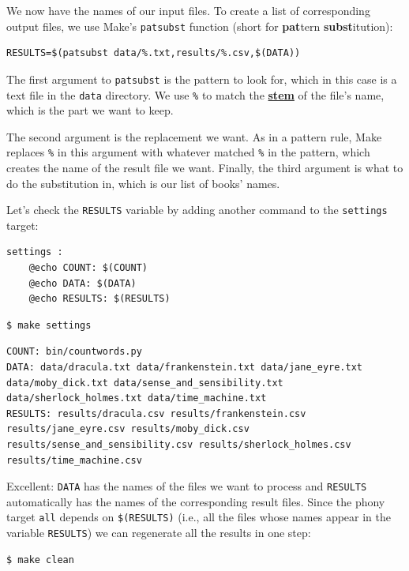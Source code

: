 \documentclass[
]{krantz}
\newcommand{\gref}[2]{\hyperlink{#2}{\textbf{#1}}}
\begin{document}
We now have the names of our input files.
To create a list of corresponding output files,
we use Make's \texttt{patsubst} function
(short for \textbf{pat}tern \textbf{subst}itution):

\begin{verbatim}
RESULTS=$(patsubst data/%.txt,results/%.csv,$(DATA))
\end{verbatim}

The first argument to \texttt{patsubst} is the pattern to look for,
which in this case is a text file in the \texttt{data} directory.
We use \texttt{\%} to match the \gref{stem}{filename\_stem} of the file's name,
which is the part we want to keep.

The second argument is the replacement we want.
As in a pattern rule,
Make replaces \texttt{\%} in this argument with whatever matched \texttt{\%} in the pattern,
which creates the name of the result file we want.
Finally,
the third argument is what to do the substitution in,
which is our list of books' names.

Let's check the \texttt{RESULTS} variable by adding another command to the \texttt{settings} target:

\begin{verbatim}
settings :
    @echo COUNT: $(COUNT)
    @echo DATA: $(DATA)
    @echo RESULTS: $(RESULTS)
\end{verbatim}

\begin{verbatim}
$ make settings
\end{verbatim}

\begin{verbatim}
COUNT: bin/countwords.py
DATA: data/dracula.txt data/frankenstein.txt data/jane_eyre.txt data/moby_dick.txt data/sense_and_sensibility.txt data/sherlock_holmes.txt data/time_machine.txt
RESULTS: results/dracula.csv results/frankenstein.csv results/jane_eyre.csv results/moby_dick.csv results/sense_and_sensibility.csv results/sherlock_holmes.csv results/time_machine.csv
\end{verbatim}

Excellent:
\texttt{DATA} has the names of the files we want to process
and \texttt{RESULTS} automatically has the names of the corresponding result files.
Since the phony target \texttt{all} depends on \texttt{\$(RESULTS)}
(i.e., all the files whose names appear in the variable \texttt{RESULTS})
we can regenerate all the results in one step:

\begin{verbatim}
$ make clean
\end{verbatim}
\end{document}
